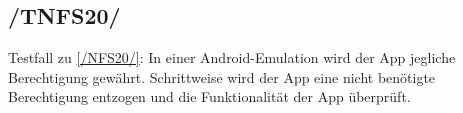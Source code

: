 \subsection*{/TNFS20/}
\label{/TNFS20/} Testfall zu \ref{/NFS20/}: In einer \Gls{Android}-\Gls{Emulation} wird der App jegliche Berechtigung gewährt.
Schrittweise wird der App eine nicht benötigte Berechtigung entzogen und die Funktionalität der App überprüft.